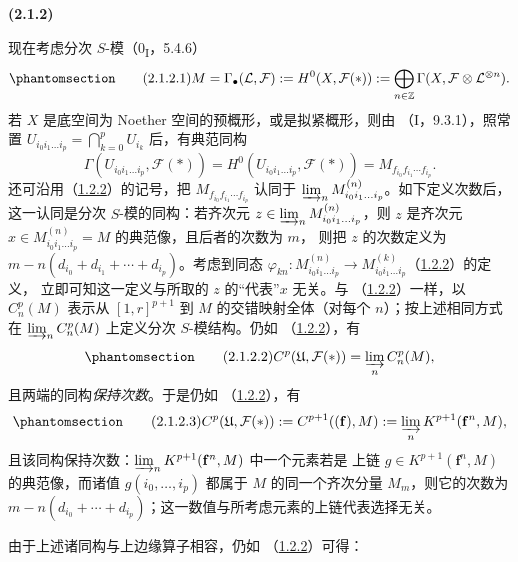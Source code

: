 \documentclass[UTF8,fontset=none,11pt,oneside,openany]{ctexbook}
\newenvironment{env}[1][]{%
  \par\medskip\noindent\textbf{(#1)}\ %
}{\par}
\newcommand{\oldpage}[2][]{%
  \hypertarget{ega-source-page-#1-#2}{}%
  \marginnote{\scriptsize\textbf{#1}~|~#2}\ignorespaces}
\let\EGAOriginalLabel\label
\renewcommand{\label}[1]{\phantomsection\EGAOriginalLabel{#1}}
\begin{document}
\begin{env}[2.1.2]
\label{III.2.1.2-fr}
现在考虑分次 $S$-模（0\textsubscript{I}，5.4.6）
\begin{equation}
\label{III.2.1.2.1-fr}
\tag{2.1.2.1}
M=\Gamma_\bullet(\mathcal L,\mathcal F)
:=H^0(X,\mathcal F(*))
:=\bigoplus_{n\in\mathbb Z}
\Gamma(X,\mathcal F\otimes\mathcal L^{\otimes n}).
\end{equation}
\oldpage[III]{96}
若 $X$ 是底空间为 Noether 空间的预概形，或是拟紧概形，则由
（I，9.3.1），照常置
$U_{i_0i_1\ldots i_p}=\bigcap_{k=0}^pU_{i_k}$ 后，有典范同构
\[
\Gamma(U_{i_0i_1\ldots i_p},\mathcal F(*))
=H^0(U_{i_0i_1\ldots i_p},\mathcal F(*))
=M_{f_{i_0}f_{i_1}\cdots f_{i_p}}.
\]
还可沿用（\hyperref[III.1.2.2-fr]{1.2.2}）的记号，把
$M_{f_{i_0}f_{i_1}\cdots f_{i_p}}$ 认同于
$\varinjlim_n M_{i_0i_1\ldots i_p}^{(n)}$。如下定义次数后，这一认同是分次
$S$-模的同构：若齐次元
$z\in\varinjlim_n M_{i_0i_1\ldots i_p}^{(n)}$，则 $z$ 是齐次元
$x\in M_{i_0i_1\ldots i_p}^{(n)}=M$ 的典范像，且后者的次数为 $m$，
则把 $z$ 的次数定义为
$m-n(d_{i_0}+d_{i_1}+\cdots+d_{i_p})$。考虑到同态
$\varphi_{kn}:M_{i_0i_1\ldots i_p}^{(n)}\to
M_{i_0i_1\ldots i_p}^{(k)}$（\hyperref[III.1.2.2-fr]{1.2.2}）的定义，
立即可知这一定义与所取的 $z$ 的“代表”$x$ 无关。与
（\hyperref[III.1.2.2-fr]{1.2.2}）一样，以 $C_n^p(M)$ 表示从
$[1,r]^{p+1}$ 到 $M$ 的交错映射全体（对每个 $n$）；按上述相同方式在
$\varinjlim_n C_n^p(M)$ 上定义分次 $S$-模结构。仍如
（\hyperref[III.1.2.2-fr]{1.2.2}），有
\begin{equation}
\label{III.2.1.2.2-fr}
\tag{2.1.2.2}
C^p(\mathfrak U,\mathcal F(*))=\varinjlim_n C_n^p(M),
\end{equation}
且两端的同构\emph{保持次数}。于是仍如
（\hyperref[III.1.2.2-fr]{1.2.2}），有
\begin{equation}
\label{III.2.1.2.3-fr}
\tag{2.1.2.3}
C^p(\mathfrak U,\mathcal F(*))
:=C^{p+1}((\mathbf f),M)
:=\varinjlim_n K^{p+1}(\mathbf f^n,M),
\end{equation}
且该同构保持次数：$\varinjlim_n K^{p+1}(\mathbf f^n,M)$ 中一个元素若是
上链 $g\in K^{p+1}(\mathbf f^n,M)$ 的典范像，而诸值
$g(i_0,\ldots,i_p)$ 都属于 $M$ 的同一个齐次分量 $M_m$，则它的次数为
$m-n(d_{i_0}+\cdots+d_{i_p})$；这一数值与所考虑元素的上链代表选择无关。
\end{env}

由于上述诸同构与上边缘算子相容，仍如
（\hyperref[III.1.2.2-fr]{1.2.2}）可得：
\end{document}
